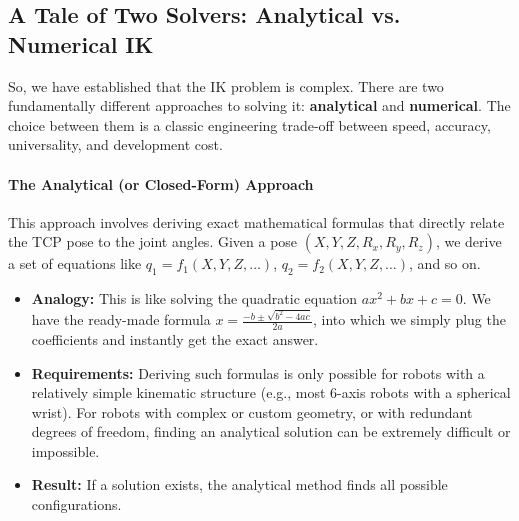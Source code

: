 \subsection{A Tale of Two Solvers: Analytical vs. Numerical IK}
\label{sec:ik_solvers}

So, we have established that the IK problem is complex. There are two fundamentally different approaches to solving it: \textbf{analytical} and \textbf{numerical}. The choice between them is a classic engineering trade-off between speed, accuracy, universality, and development cost.

\paragraph{The Analytical (or Closed-Form) Approach}
This approach involves deriving exact mathematical formulas that directly relate the TCP pose to the joint angles. Given a pose $(X, Y, Z, R_x, R_y, R_z)$, we derive a set of equations like $q_1 = f_1(X, Y, Z, \dots)$, $q_2 = f_2(X, Y, Z, \dots)$, and so on.
\begin{itemize}
    \item \textbf{Analogy:} This is like solving the quadratic equation $ax^2+bx+c=0$. We have the ready-made formula $x = \frac{-b \pm \sqrt{b^2-4ac}}{2a}$, into which we simply plug the coefficients and instantly get the exact answer.
    \item \textbf{Requirements:} Deriving such formulas is only possible for robots with a relatively simple kinematic structure (e.g., most 6-axis robots with a spherical wrist). For robots with complex or custom geometry, or with redundant degrees of freedom, finding an analytical solution can be extremely difficult or impossible.
    \item \textbf{Result:} If a solution exists, the analytical method finds all possible configurations.
\end{itemize}

